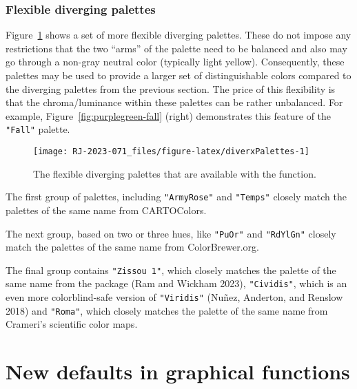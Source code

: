 \hypertarget{flexible-diverging-palettes}{%
\subsubsection{Flexible diverging palettes}\label{flexible-diverging-palettes}}

Figure~\ref{fig:diverxPalettes} shows a set of
more flexible diverging
palettes. These do not impose
any restrictions that the two ``arms'' of the palette need to be
balanced and also may go through a non-gray neutral color (typically
light yellow). Consequently, these palettes may be used to provide a larger
set of distinguishable colors compared to the diverging palettes from
the previous section. The price of this flexibility is that
the chroma/luminance within these palettes
can be rather unbalanced.
For example, Figure~\ref{fig:purplegreen-fall} (right) demonstrates this
feature of the \texttt{"Fall"} palette.

\begin{figure}[ht!]

{\centering \texttt{[image: RJ-2023-071\_files/figure-latex/diverxPalettes-1]} 

}

\caption{The flexible diverging palettes that are available with the  function.}\label{fig:diverxPalettes}
\end{figure}

The first group of palettes, including
\texttt{"ArmyRose"} and \texttt{"Temps"} closely match the palettes of the same name
from CARTOColors.

The next group, based on two or three hues, like \texttt{"PuOr"} and \texttt{"RdYlGn"}
closely match the
palettes of the same name from ColorBrewer.org.

The final group contains
\texttt{"Zissou\ 1"}, which closely matches the palette of the same name from
the  package (Ram and Wickham 2023), \texttt{"Cividis"},
which is an even more colorblind-safe version of \texttt{"Viridis"} (Nuñez, Anderton, and Renslow 2018) and
\texttt{"Roma"}, which closely matches the palette of the same name
from Crameri's scientific color maps.

\hypertarget{new-defaults-in-graphical-functions}{%
\section{New defaults in graphical functions}\label{new-defaults-in-graphical-functions}}

